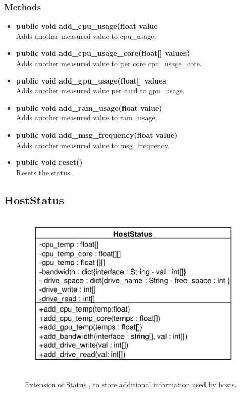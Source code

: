 \subsubsection{Methods}
\begin{itemize}
	\item \textbf{public void add\_cpu\_usage(float value}\\
	Adds another measured value to cpu\_usage.
	\item \textbf{public void add\_cpu\_usage\_core(float[] values)}\\
	Adds another measured value to per core cpu\_usage\_core.
	\item \textbf{public void add\_gpu\_usage(float[] values}\\
	Adds another measured value per card to gpu\_usage.
	\item \textbf{public void add\_ram\_usage(float value)}\\
	Adds another measured value to ram\_usage.
	\item \textbf{public void add\_msg\_frequency(float value)}\\
	Adds another measured value to msg\_frequency.
	\item \textbf{public void reset()}\\
	Resets the status.
\end{itemize}

\subsection{HostStatus}

\begin{figure}[htbp]
	\begin{minipage}[t]{7cm}
		\vspace{0pt}
		\centering
		\includegraphics[scale=0.6]{./diagram_pictures/NodeInterface/HostStatus.pdf}
	\end{minipage}
	\hfill
	\begin{minipage}[t]{8cm}
		\vspace{10pt}
		Extension of Status , to store additional information used by hosts.
	\end{minipage}
\end{figure}


